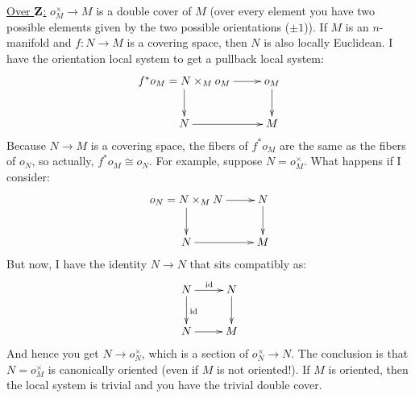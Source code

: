 \underline{Over $\mathbf Z$:} $o_M^\times\to M$ is a double cover of $M$ (over every element you have two possible elements given by the two possible orientations ($\pm 1$)). If $M$ is an $n$-manifold and $f:N\to M$ is a covering space, then $N$ is also locally Euclidean. I have the orientation local system to get a pullback local system:
\begin{equation*}
\xymatrix{
	f^\ast o_M=N\times_M o_M\ar[r]\ar[d] & o_M\ar[d]\\
	N\ar[r] & M
}
\end{equation*}
Because $N\to M$ is a covering space, the fibers of $f^\ast o_M$ are the same as the fibers of $o_N$, so actually, $f^\ast o_M\cong o_N$. For example, suppose $N=o_M^\times$. What happens if I consider:
\begin{equation*}
\xymatrix{
	o_N=N\times_M N\ar[r]\ar[d] & N\ar[d]\\
	N\ar[r] & M
}
\end{equation*}
But now, I have the identity $N\to N$ that sits compatibly as:
\begin{equation*}
\xymatrix{
	N\ar[r]^{\mathrm{id}}\ar[d] ^{\mathrm{id}} & N\ar[d]\\
	N\ar[r] & M
}
\end{equation*}
And hence you get $N\to o_N^\times$, which is a section of $o_N^\times\to N$. The conclusion is that $N=o_M^\times$ is canonically oriented (even if $M$ is not oriented!). If $M$ is oriented, then the local system is trivial and you have the trivial double cover.

